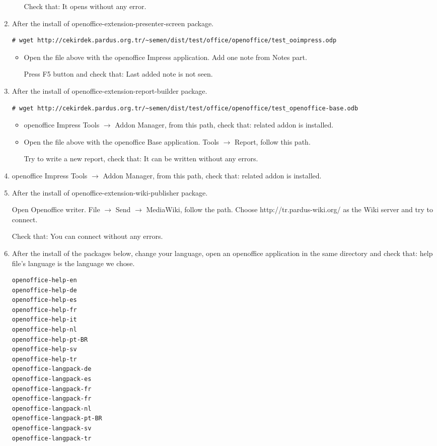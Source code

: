 \documentclass[a4paper,10pt]{article}
\begin{document}
\begin{enumerate}
\begin{itemize}
Check that: It opens without any error.

\end{itemize}
 
\item After the install of openoffice-extension-presenter-screen package.
\begin{verbatim}
# wget http://cekirdek.pardus.org.tr/~semen/dist/test/office/openoffice/test_ooimpress.odp
\end{verbatim}

\begin{itemize}


\item Open the file above with the openoffice Impress application. Add one note from Notes part. 

Press F5 button and check that: Last added note is not seen.

\end{itemize}
\item After the install of openoffice-extension-report-builder package.
\begin{verbatim}
# wget http://cekirdek.pardus.org.tr/~semen/dist/test/office/openoffice/test_openoffice-base.odb
\end{verbatim}

\begin{itemize}
\item openoffice Impress Tools $\rightarrow$ Addon Manager, from this path, check that: related addon is installed.

\item Open the file above with the openoffice Base application. Tools $\rightarrow$ Report, follow this path.

Try to write a new report, check that: It can be written without any errors.

\end{itemize}
\item openoffice Impress Tools $\rightarrow$ Addon Manager, from this path, check that: related addon is installed.

\item After the install of openoffice-extension-wiki-publisher package.

Open Openoffice writer. File $\rightarrow$ Send $\rightarrow$ MediaWiki, follow the path. Choose http://tr.pardus-wiki.org/ as the Wiki server   and try to connect.

Check that: You can connect without any errors.

\item After the install of the packages below, change your language, open an openoffice application in the same directory and check that: help file's language is the language we chose.
\begin{verbatim}
openoffice-help-en 
openoffice-help-de
openoffice-help-es
openoffice-help-fr
openoffice-help-it
openoffice-help-nl
openoffice-help-pt-BR
openoffice-help-sv
openoffice-help-tr
openoffice-langpack-de
openoffice-langpack-es
openoffice-langpack-fr
openoffice-langpack-fr
openoffice-langpack-nl
openoffice-langpack-pt-BR
openoffice-langpack-sv
openoffice-langpack-tr


\end{verbatim}
\end{enumerate}
\end{document}
